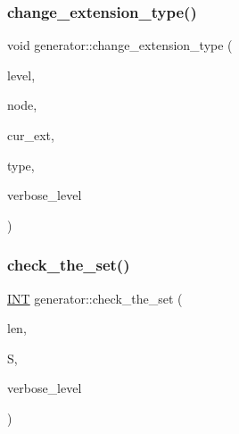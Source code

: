 \subsubsection{\texorpdfstring{change\+\_\+extension\+\_\+type()}{change\_extension\_type()}}
{\footnotesize\ttfamily void generator\+::change\+\_\+extension\+\_\+type (\begin{DoxyParamCaption}\item[{\mbox{\hyperlink{galois_8h_a09fddde158a3a20bd2dcadb609de11dc}{I\+NT}}}]{level,  }\item[{\mbox{\hyperlink{galois_8h_a09fddde158a3a20bd2dcadb609de11dc}{I\+NT}}}]{node,  }\item[{\mbox{\hyperlink{galois_8h_a09fddde158a3a20bd2dcadb609de11dc}{I\+NT}}}]{cur\+\_\+ext,  }\item[{\mbox{\hyperlink{galois_8h_a09fddde158a3a20bd2dcadb609de11dc}{I\+NT}}}]{type,  }\item[{\mbox{\hyperlink{galois_8h_a09fddde158a3a20bd2dcadb609de11dc}{I\+NT}}}]{verbose\+\_\+level }\end{DoxyParamCaption})}

\mbox{\label{classgenerator_a584bdf110f34a1d5c171a6d56c1a33ec}} 
\subsubsection{\texorpdfstring{check\+\_\+the\+\_\+set()}{check\_the\_set()}}
{\footnotesize\ttfamily \mbox{\hyperlink{galois_8h_a09fddde158a3a20bd2dcadb609de11dc}{I\+NT}} generator\+::check\+\_\+the\+\_\+set (\begin{DoxyParamCaption}\item[{\mbox{\hyperlink{galois_8h_a09fddde158a3a20bd2dcadb609de11dc}{I\+NT}}}]{len,  }\item[{\mbox{\hyperlink{galois_8h_a09fddde158a3a20bd2dcadb609de11dc}{I\+NT}} $\ast$}]{S,  }\item[{\mbox{\hyperlink{galois_8h_a09fddde158a3a20bd2dcadb609de11dc}{I\+NT}}}]{verbose\+\_\+level }\end{DoxyParamCaption})}

\mbox{\label{classgenerator_a6ffae728f3b12f9879cb614d9b37660a}} 
